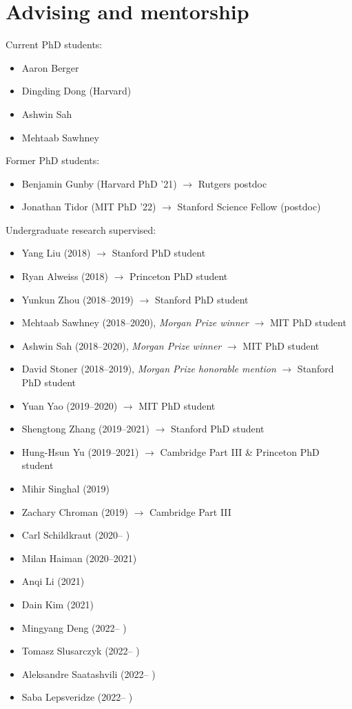 \documentclass[11pt]{amsart}
\begin{document}
\newpage




\section*{Advising and mentorship}

Current PhD students: 
\begin{itemize}[topsep=-.5ex,label={},leftmargin=.2in]
\item Aaron Berger
\item Dingding Dong (Harvard)
\item Ashwin Sah
\item Mehtaab Sawhney
\end{itemize}

Former PhD students:
\begin{itemize}[topsep=-.5ex,label={},leftmargin=.2in]
	\item Benjamin Gunby (Harvard PhD '21) $\to$ Rutgers postdoc
	\item Jonathan Tidor (MIT PhD '22) $\to$ Stanford Science Fellow (postdoc)
\end{itemize}

Undergraduate research supervised: 
\begin{itemize}[topsep=-.5ex,label={},leftmargin=.2in]
\item Yang Liu (2018) $\to$ Stanford PhD student
\item Ryan Alweiss (2018) $\to$ Princeton PhD student
\item Yunkun Zhou (2018--2019) $\to$ Stanford PhD student
\item Mehtaab Sawhney (2018--2020), \emph{Morgan Prize winner}  $\to$ MIT PhD student
\item Ashwin Sah (2018--2020), \emph{Morgan Prize winner} $\to$ MIT PhD student
\item David Stoner (2018--2019), \emph{Morgan Prize honorable mention} $\to$ Stanford PhD student
\item Yuan Yao (2019--2020) $\to$ MIT PhD student
\item Shengtong Zhang (2019--2021) $\to$ Stanford PhD student
\item Hung-Hsun Yu (2019--2021) $\to$ Cambridge Part III \& Princeton PhD student
\item Mihir Singhal (2019)
\item Zachary Chroman (2019) $\to$ Cambridge Part III
\item Carl Schildkraut (2020-- )
\item Milan Haiman (2020--2021)
\item Anqi Li (2021)
\item Dain Kim (2021)
\item Mingyang Deng (2022-- )
\item Tomasz Slusarczyk (2022-- )
\item Aleksandre Saatashvili (2022-- )
\item Saba Lepsveridze (2022-- )
\end{itemize}
\end{document}
